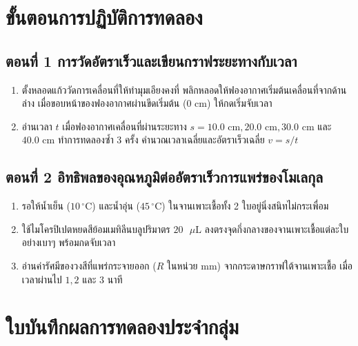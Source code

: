 \section{ขั้นตอนการปฏิบัติการทดลอง}

\subsection{ตอนที่ 1 การวัดอัตราเร็วและเขียนกราฟระยะทางกับเวลา}
\begin{enumerate}
    \item ตั้งหลอดแก้ววัดการเคลื่อนที่ให้ทำมุมเอียงคงที่ พลิกหลอดให้ฟองอากาศเริ่มต้นเคลื่อนที่จากด้านล่าง เมื่อขอบหน้าของฟองอากาศผ่านขีดเริ่มต้น ($0\text{ cm}$) ให้กดเริ่มจับเวลา
    \item อ่านเวลา $t$ เมื่อฟองอากาศเคลื่อนที่ผ่านระยะทาง $s = 10.0\text{ cm}, 20.0\text{ cm}, 30.0\text{ cm}$ และ $40.0\text{ cm}$ ทำการทดลองซ้ำ 3 ครั้ง คำนวณเวลาเฉลี่ยและอัตราเร็วเฉลี่ย $v = s/t$
\end{enumerate}

\subsection{ตอนที่ 2 อิทธิพลของอุณหภูมิต่ออัตราเร็วการแพร่ของโมเลกุล}
\begin{enumerate}
    \item รอให้น้ำเย็น ($10\,^\circ\text{C}$) และน้ำอุ่น ($45\,^\circ\text{C}$) ในจานเพาะเชื้อทั้ง 2 ใบอยู่นิ่งสนิทไม่กระเพื่อม
    \item ใช้ไมโครปิเปตหยดสีย้อมเมทิลีนบลูปริมาตร $20\text{ }\mu\text{L}$ ลงตรงจุดกึ่งกลางของจานเพาะเชื้อแต่ละใบอย่างเบาๆ พร้อมกดจับเวลา
    \item อ่านค่ารัศมีของวงสีที่แพร่กระจายออก ($R$ ในหน่วย $\text{mm}$) จากกระดาษกราฟใต้จานเพาะเชื้อ เมื่อเวลาผ่านไป $1, 2$ และ $3$ นาที
\end{enumerate}

\section{ใบบันทึกผลการทดลองประจำกลุ่ม}

